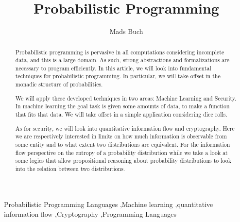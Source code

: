 \begin{frontmatter}



\title{Probabilistic Programming}


\author{Mads Buch}

\address{Aarhus, Denmark}

\begin{abstract}
Probabilistic programming is pervasive in all computations considering
incomplete data, and this is a large domain. As such,
strong abstractions and formalizations are necessary to program efficiently.
In this article, we will look into fundamental techniques for probabilistic
programming. In particular, we will take offset in the monadic structure of
probabilities.

We will apply these developed techniques in two areas: Machine Learning and
Security. In machine learning the goal task is given some amounts of data, to
make a function that fits that data. We will take offset in a simple application
considering dice rolls.

As for security, we will look into 
quantitative information flow and cryptography. Here we are respectively
interested in
limits on how much information is observable from some entity and to what
extent two distributions are equivalent. For the information flow perspective on
the entropy of a probability distribution while we take a look at some logics that allow
propositional reasoning about probability distributions to look into the
relation between two distributions.
\end{abstract}

\begin{keyword}
Probabilistic Programming Languages \sep Machine learning \sep quantitative
information flow \sep Cryptography \sep Programming Languages


\end{keyword}

\end{frontmatter}

\newpage